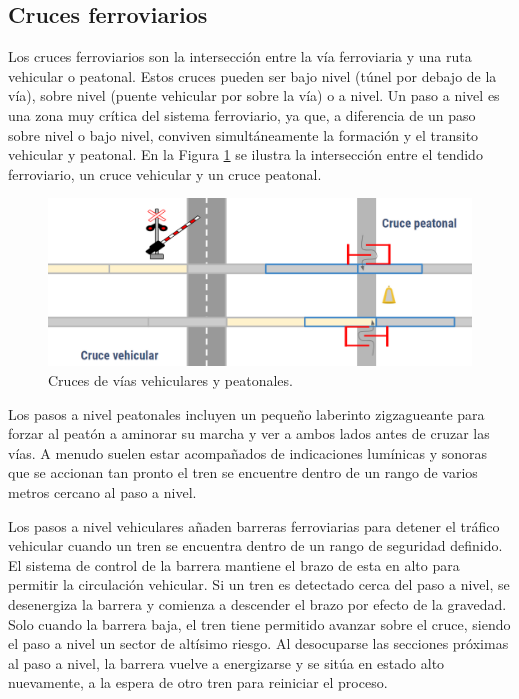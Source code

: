 \subsection{Cruces ferroviarios}
    \label{sec:crossing}
    
    Los cruces ferroviarios son la intersección entre la vía ferroviaria y una ruta vehicular o peatonal. Estos cruces pueden ser bajo nivel (túnel por debajo de la vía), sobre nivel (puente vehicular por sobre la vía) o a nivel. Un paso a nivel es una zona muy crítica del sistema ferroviario, ya que, a diferencia de un paso sobre nivel o bajo nivel, conviven simultáneamente la formación y el transito vehicular y peatonal. En la Figura \ref{fig:cruce_1} se ilustra la intersección entre el tendido ferroviario, un cruce vehicular y un cruce peatonal.
    
        \begin{figure}[H]
            \centering
            \includegraphics[width=1\textwidth]{Figuras/cruce}
            \centering\caption{Cruces de vías vehiculares y peatonales.}
            \label{fig:cruce_1}
        \end{figure}
        
    Los pasos a nivel peatonales incluyen un pequeño laberinto zigzagueante para forzar al peatón a aminorar su marcha y ver a ambos lados antes de cruzar las vías. A menudo suelen estar acompañados de indicaciones lumínicas y sonoras que se accionan tan pronto el tren se encuentre dentro de un rango de varios metros cercano al paso a nivel.
    
    Los pasos a nivel vehiculares añaden barreras ferroviarias para detener el tráfico vehicular cuando un tren se encuentra dentro de un rango de seguridad definido.  El sistema de control de la barrera mantiene el brazo de esta en alto para permitir la circulación vehicular. Si un tren es detectado cerca del paso a nivel, se desenergiza la barrera y comienza a descender el brazo por efecto de la gravedad. Solo cuando la barrera baja, el tren tiene permitido avanzar sobre el cruce, siendo el paso a nivel un sector de altísimo riesgo. Al desocuparse las secciones próximas al paso a nivel, la barrera vuelve a energizarse y se sitúa en estado alto nuevamente, a la espera de otro tren para reiniciar el proceso. 
    
